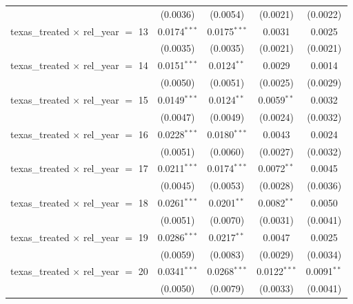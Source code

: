 \begin{tabular}{lcccc}
                                                & (0.0036)       & (0.0054)       & (0.0021)        & (0.0022)\\   
   texas\_treated $\times$ rel\_year $=$ 13     & 0.0174$^{***}$ & 0.0175$^{***}$ & 0.0031          & 0.0025\\   
                                                & (0.0035)       & (0.0035)       & (0.0021)        & (0.0021)\\   
   texas\_treated $\times$ rel\_year $=$ 14     & 0.0151$^{***}$ & 0.0124$^{**}$  & 0.0029          & 0.0014\\   
                                                & (0.0050)       & (0.0051)       & (0.0025)        & (0.0029)\\   
   texas\_treated $\times$ rel\_year $=$ 15     & 0.0149$^{***}$ & 0.0124$^{**}$  & 0.0059$^{**}$   & 0.0032\\   
                                                & (0.0047)       & (0.0049)       & (0.0024)        & (0.0032)\\   
   texas\_treated $\times$ rel\_year $=$ 16     & 0.0228$^{***}$ & 0.0180$^{***}$ & 0.0043          & 0.0024\\   
                                                & (0.0051)       & (0.0060)       & (0.0027)        & (0.0032)\\   
   texas\_treated $\times$ rel\_year $=$ 17     & 0.0211$^{***}$ & 0.0174$^{***}$ & 0.0072$^{**}$   & 0.0045\\   
                                                & (0.0045)       & (0.0053)       & (0.0028)        & (0.0036)\\   
   texas\_treated $\times$ rel\_year $=$ 18     & 0.0261$^{***}$ & 0.0201$^{**}$  & 0.0082$^{**}$   & 0.0050\\   
                                                & (0.0051)       & (0.0070)       & (0.0031)        & (0.0041)\\   
   texas\_treated $\times$ rel\_year $=$ 19     & 0.0286$^{***}$ & 0.0217$^{**}$  & 0.0047          & 0.0025\\   
                                                & (0.0059)       & (0.0083)       & (0.0029)        & (0.0034)\\   
   texas\_treated $\times$ rel\_year $=$ 20     & 0.0341$^{***}$ & 0.0268$^{***}$ & 0.0122$^{***}$  & 0.0091$^{**}$\\   
                                                & (0.0050)       & (0.0079)       & (0.0033)        & (0.0041)\\   

\end{tabular}
